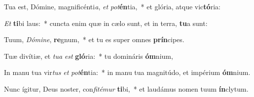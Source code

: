 \item Tua est, Dómine, magnificénti\textit{a}, \textit{et} \textit{pot}\textbf{én}tia,~* et glória, atque vic\textbf{tó}ria:
\item \textit{Et} \textbf{ti}bi laus:~* cuncta enim quæ in cælo sunt, et in terra, \textbf{tu}a sunt:
\item Tuum, \textit{Dó}\textit{mi}\textit{ne}, \textbf{re}gnum,~* et tu es super omnes \textbf{prín}cipes.
\item Tuæ divítiæ, et \textit{tu}\textit{a} \textit{est} \textbf{gló}ria:~* tu domináris \textbf{óm}nium,
\item In manu tua vir\textit{tus} \textit{et} \textit{pot}\textbf{én}tia:~* in manu tua magnitúdo, et impérium \textbf{óm}nium.
\item Nunc ígitur, Deus noster, con\textit{fi}\textit{té}\textit{mur} \textbf{ti}bi,~* et laudámus nomen tuum \textbf{ín}clytum.
